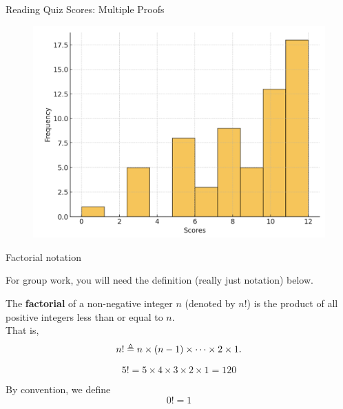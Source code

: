 \documentclass[10pt]{beamer}
\begin{document}
\begin{frame}{Reading Quiz Scores: Multiple Proofs}

\begin{figure}[ht]
        \centering
        \includegraphics[width=.8\textwidth]{images/ch2_reading_quiz_scores}
\end{figure}
\vfill 

\end{frame}



\begin{frame}{Factorial notation}

For group work, you will need the definition (really just notation) below. 

\vfill 
\begin{mygreenbox}[title=Definition]
The \textbf{factorial} of a non-negative integer $n$ (denoted by $n!$) is the product of all positive integers less than or equal to $n$. \\

That is,
\[n! \triangleq n \times (n-1) \times \cdots \times 2 \times 1.\]
\end{mygreenbox}

\vfill 

\begin{myredbox}[title=Example]
\[ 5! = 5 \times 4 \times 3 \times 2 \times 1 = 120  \]
\end{myredbox}

\vfill 

\begin{myyellowbox}[title=Convention]
By convention, we define 
\[0! =1 \]
\end{myyellowbox}

\end{frame}
\end{document}
